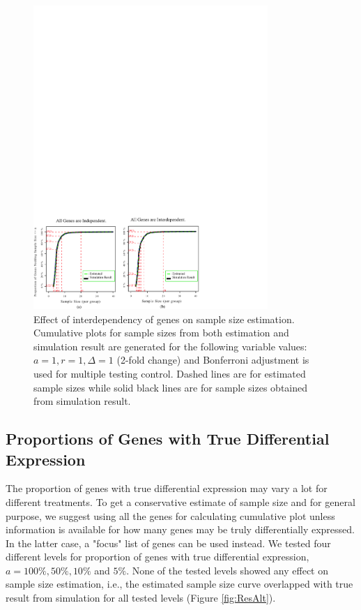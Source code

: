 \documentclass{bioinfo}
\begin{document}
\begin{figure}[h]
  \centerline{\includegraphics*[width=3.5in]{ResDepF.pdf}}
  \caption[Effect of interdependency of genes on sample size estimation]
  {Effect of interdependency of genes on sample size estimation.
    Cumulative plots for sample sizes from both estimation and simulation result
    are generated for the following variable values: $a = 1, r = 1, \Delta = 1$ (2-fold
    change) and Bonferroni adjustment is used for multiple testing control. Dashed lines are for estimated sample sizes
    while solid black lines are for sample sizes obtained from simulation result.}
  \label{fig:ResDep}
\end{figure}

\subsection{Proportions of Genes with True Differential
Expression} The proportion of genes with true differential
expression may vary a lot for different treatments. To get a
conservative estimate of sample size and for general purpose, we
suggest using all the genes for calculating cumulative plot unless
information is available for how many genes may be truly
differentially expressed. In the latter case, a "focus" list of
genes can be used instead. We tested four different levels for
proportion of genes with true differential expression, $a = 100\%,
50\%, 10\%$ and $5\%$. None of the tested levels showed any effect
on sample size estimation, i.e., the estimated sample size curve
overlapped with true result from simulation for all tested levels
(Figure \ref{fig:ResAlt}).
\end{document}
